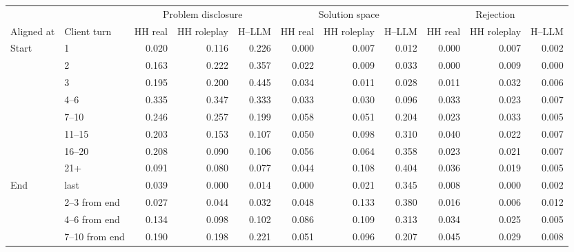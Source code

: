 \begin{tabular}{llrrrrrrrrr}
\toprule
 & & \multicolumn{3}{c}{Problem disclosure} & \multicolumn{3}{c}{Solution space} & \multicolumn{3}{c}{Rejection} \\
\cmidrule(lr){3-5}\cmidrule(lr){6-8}\cmidrule(lr){9-11}
Aligned at & Client turn & HH real & HH roleplay & H--LLM & HH real & HH roleplay & H--LLM & HH real & HH roleplay & H--LLM \\
\midrule
Start & 1 & 0.020 & 0.116 & 0.226 & 0.000 & 0.007 & 0.012 & 0.000 & 0.007 & 0.002 \\
 & 2 & 0.163 & 0.222 & 0.357 & 0.022 & 0.009 & 0.033 & 0.000 & 0.009 & 0.000 \\
 & 3 & 0.195 & 0.200 & 0.445 & 0.034 & 0.011 & 0.028 & 0.011 & 0.032 & 0.006 \\
 & 4--6 & 0.335 & 0.347 & 0.333 & 0.033 & 0.030 & 0.096 & 0.033 & 0.023 & 0.007 \\
 & 7--10 & 0.246 & 0.257 & 0.199 & 0.058 & 0.051 & 0.204 & 0.023 & 0.033 & 0.005 \\
 & 11--15 & 0.203 & 0.153 & 0.107 & 0.050 & 0.098 & 0.310 & 0.040 & 0.022 & 0.007 \\
 & 16--20 & 0.208 & 0.090 & 0.106 & 0.056 & 0.064 & 0.358 & 0.023 & 0.021 & 0.007 \\
 & 21+ & 0.091 & 0.080 & 0.077 & 0.044 & 0.108 & 0.404 & 0.036 & 0.019 & 0.005 \\
\midrule
End & last & 0.039 & 0.000 & 0.014 & 0.000 & 0.021 & 0.345 & 0.008 & 0.000 & 0.002 \\
 & 2--3 from end & 0.027 & 0.044 & 0.032 & 0.048 & 0.133 & 0.380 & 0.016 & 0.006 & 0.012 \\
 & 4--6 from end & 0.134 & 0.098 & 0.102 & 0.086 & 0.109 & 0.313 & 0.034 & 0.025 & 0.005 \\
 & 7--10 from end & 0.190 & 0.198 & 0.221 & 0.051 & 0.096 & 0.207 & 0.045 & 0.029 & 0.008 \\
\bottomrule
\end{tabular}

